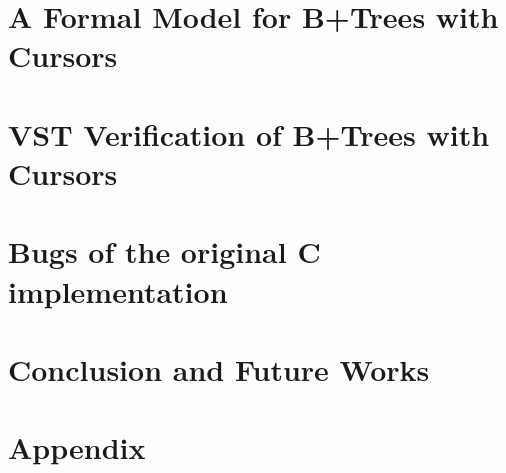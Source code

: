 \documentclass{llncs2e/llncs}
\begin{document}
\section{A Formal Model for B+Trees with Cursors}
\label{sec:model}


\section{VST Verification of B+Trees with Cursors}
\label{sec:verif}


\section{Bugs of the original C implementation}
\label{sec:bugs}


\section{Conclusion and Future Works}
\label{sec:conclusion}


\newpage
{}
\nocite{*}



\newpage
\section{Appendix}
\label{sec:appendix}

\end{document}
